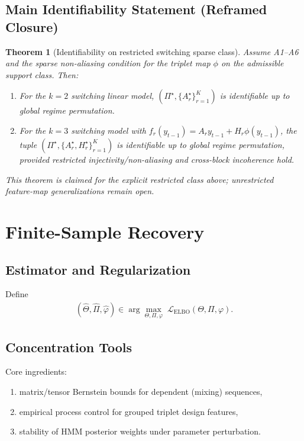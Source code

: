 \documentclass[11pt]{article}
\newtheorem{theorem}{Theorem}
\begin{document}
\subsection{Main Identifiability Statement (Reframed Closure)}
\begin{theorem}[Identifiability on restricted switching sparse class]
Assume A1--A6 and the sparse non-aliasing condition for the triplet map $\phi$ on the
admissible support class. Then:
\begin{enumerate}
    \item For the $k=2$ switching linear model, $(\Pi^\star,\{A_r^\star\}_{r=1}^K)$ is
    identifiable up to global regime permutation.
    \item For the $k=3$ switching model with
    $f_r(y_{t-1})=A_r y_{t-1}+H_r\phi(y_{t-1})$, the tuple
    $(\Pi^\star,\{A_r^\star,H_r^\star\}_{r=1}^K)$ is identifiable up to global regime
    permutation, provided restricted injectivity/non-aliasing and cross-block incoherence hold.
\end{enumerate}
\noindent
This theorem is claimed for the explicit restricted class above; unrestricted feature-map
generalizations remain open.
\end{theorem}

\section{Finite-Sample Recovery}
\subsection{Estimator and Regularization}
Define
\begin{align}
(\hat\Theta,\hat\Pi,\hat\varphi)
    \in \arg\max_{\Theta,\Pi,\varphi}\;
    \mathcal{L}_{\text{ELBO}}(\Theta,\Pi,\varphi).
\end{align}

\subsection{Concentration Tools}
Core ingredients:
\begin{enumerate}
    \item matrix/tensor Bernstein bounds for dependent (mixing) sequences,
    \item empirical process control for grouped triplet design features,
    \item stability of HMM posterior weights under parameter perturbation.
\end{enumerate}
\end{document}
